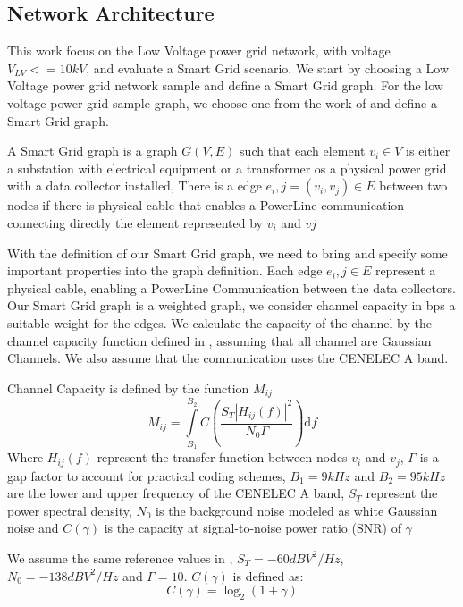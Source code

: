 \subsection{Network Architecture}\label{sec:arch}
This work focus on the Low Voltage power grid network, with voltage $V_{LV} <= 10 kV$, and evaluate a Smart Grid scenario. We start by choosing a Low Voltage power grid network sample and define a Smart Grid graph. For the low voltage power grid sample graph, we choose one from the work of \cite{pagani2013grid} and define a Smart Grid graph.
\begin{definition} 
A Smart Grid graph is a graph $G(V,E)$ such that each element $v_i \in V$ is either a substation with electrical equipment or a transformer os a physical power grid with a data collector installed, There is a edge $e_i,j =(v_i,v_j) \in E$ between two nodes if there is physical cable  that enables a PowerLine communication connecting directly the element represented by $v_i$ and $vj$ 
\end{definition}
With the definition of our Smart Grid graph, we need to bring and specify some important properties into the graph definition.
Each edge $e_i,j\in E$ represent a physical cable, enabling a PowerLine Communication between the data collectors. Our Smart Grid graph is a weighted graph, we consider channel capacity in bps a suitable weight for the edges. We calculate the capacity of the channel by the channel capacity function defined in \cite{biagi2010location} , assuming that all channel are Gaussian Channels. We also assume that the communication uses the CENELEC A band.
\begin{definition} Channel Capacity is defined by the function $M_{ij}$
\begin{equation*} 
M_{ij} = \int\limits_{B_1}^{B_2}  C  \left( \frac{S_T | H_{ij}(f) |^2} {N_0\Gamma} \right)  \mathrm{d}f
 \end{equation*}
Where $H_{ij}(f)$ represent the transfer function between nodes $v_i$ and $v_j$, $\Gamma$ is a gap factor to account for practical coding schemes, $B_1 = 9kHz$ and $B_2 = 95 kHz$ are the lower and upper frequency of the CENELEC A band, $S_T$ represent the power spectral density, $N_0$ is the background noise modeled as white Gaussian noise and $C(\gamma)$ is the capacity at signal-to-noise power ratio (SNR) of $\gamma$
\end{definition}
We assume the same reference values in \cite{biagi2010location}, $S_T=-60dBV^2/Hz$, $N_0=-138 dBV^2/Hz$ and $\Gamma = 10$. $C(\gamma)$ is defined as:
\begin{equation*}
C(\gamma) = \log_2(1+\gamma)
\end{equation*}
